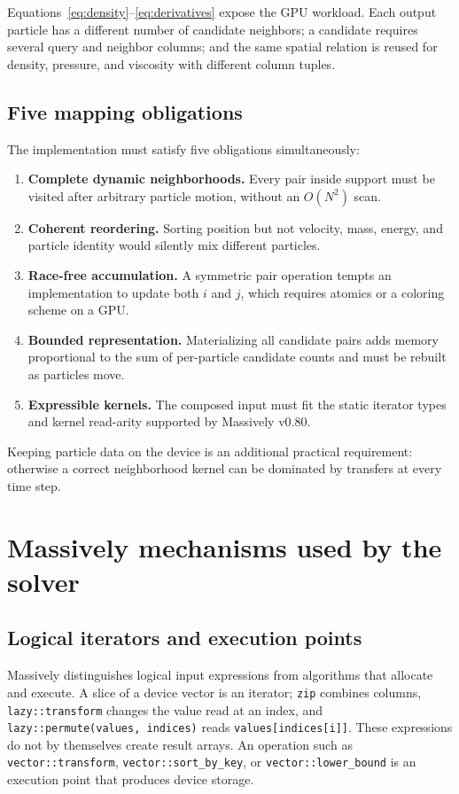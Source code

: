 \documentclass[a4paper,10pt]{article}
\newcommand{\code}[1]{\texttt{#1}}
\begin{document}
Equations~\eqref{eq:density}--\eqref{eq:derivatives} expose the GPU workload.
Each output particle has a different number of candidate neighbors; a candidate
requires several query and neighbor columns; and the same spatial relation is
reused for density, pressure, and viscosity with different column tuples.

\subsection{Five mapping obligations}

The implementation must satisfy five obligations simultaneously:
\begin{enumerate}
  \item \textbf{Complete dynamic neighborhoods.}  Every pair inside support
        must be visited after arbitrary particle motion, without an $O(N^2)$
        scan.
  \item \textbf{Coherent reordering.}  Sorting position but not velocity, mass,
        energy, and particle identity would silently mix different particles.
  \item \textbf{Race-free accumulation.}  A symmetric pair operation tempts an
        implementation to update both $i$ and $j$, which requires atomics or a
        coloring scheme on a GPU.
  \item \textbf{Bounded representation.}  Materializing all candidate pairs
        adds memory proportional to the sum of per-particle candidate counts and
        must be rebuilt as particles move.
  \item \textbf{Expressible kernels.}  The composed input must fit the static
        iterator types and kernel read-arity supported by Massively v0.80.
\end{enumerate}
Keeping particle data on the device is an additional practical requirement:
otherwise a correct neighborhood kernel can be dominated by transfers at every
time step.

\section{Massively mechanisms used by the solver}

\subsection{Logical iterators and execution points}

Massively distinguishes logical input expressions from algorithms that allocate
and execute.  A slice of a device vector is an iterator; \code{zip} combines
columns, \code{lazy::transform} changes the value read at an index, and
\code{lazy::permute(values, indices)} reads \code{values[indices[i]]}.  These
expressions do not by themselves create result arrays.  An operation such as
\code{vector::transform}, \code{vector::sort\_by\_key}, or
\code{vector::lower\_bound} is an execution point that produces device storage.
\end{document}
